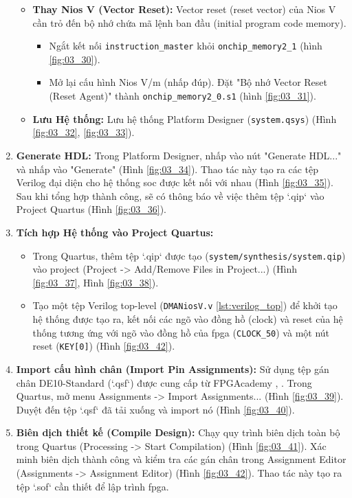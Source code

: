 \begin{enumerate}
\begin{itemize}
        \item \textbf{Thay Nios V (Vector Reset):} Vector reset (reset vector) của Nios V cần trỏ đến bộ nhớ chứa mã lệnh ban đầu (initial program code memory). 
        \begin{itemize}
            \item Ngắt kết nối \texttt{instruction\_master} khỏi \texttt{onchip\_memory2\_1} (hình \ref{fig:03_30}). 
            \item Mở lại cấu hình Nios V/m (nhấp đúp). Đặt "Bộ nhớ Vector Reset (Reset Agent)" thành \texttt{onchip\_memory2\_0.s1} (hình \ref{fig:03_31}).
        \end{itemize}
        \item \textbf{Lưu Hệ thống:} Lưu hệ thống Platform Designer (\texttt{system.qsys}) (Hình \ref{fig:03_32}, \ref{fig:03_33}).
    \end{itemize}
    \item \textbf{Generate HDL:} Trong Platform Designer, nhấp vào nút "Generate HDL..." và nhấp vào "Generate" (Hình \ref{fig:03_34}). Thao tác này tạo ra các tệp Verilog đại diện cho hệ thống \acrshort{soc} được kết nối với nhau (Hình \ref{fig:03_35}). Sau khi tổng hợp thành công, sẽ có thông báo về việc thêm tệp `.qip` vào Project Quartus (Hình \ref{fig:03_36}).
    \item \textbf{Tích hợp Hệ thống vào Project Quartus:}
    \begin{itemize}
        \item Trong Quartus, thêm tệp `.qip` được tạo (\texttt{system/synthesis/system.qip}) vào project (Project -> Add/Remove Files in Project...) (Hình \ref{fig:03_37}, Hình \ref{fig:03_38}).
        \item Tạo một tệp Verilog top-level (\texttt{DMANiosV.v} \ref{lst:verilog_top}) để khởi tạo hệ thống được tạo ra, kết nối các ngõ vào đồng hồ (clock) và reset của hệ thống tương ứng với ngõ vào đồng hồ của \acrshort{fpga} (\texttt{CLOCK\_50}) và một nút reset (\texttt{KEY[0]}) (Hình \ref{fig:03_42}). 
    \end{itemize}
    \item \textbf{Import cấu hình chân (Import Pin Assignments):} Sử dụng tệp gán chân DE10-Standard (`.qsf`) được cung cấp từ FPGAcademy \cite{fpgacademy-qsf}, \cite{fpgacademy-boards}. Trong Quartus, mở menu Assignments -> Import Assignments... (Hình \ref{fig:03_39}). Duyệt đến tệp `.qsf` đã tải xuống và import nó (Hình \ref{fig:03_40}).
    \item \textbf{Biên dịch thiết kế (Compile Design):} Chạy quy trình biên dịch toàn bộ trong Quartus (Processing -> Start Compilation) (Hình \ref{fig:03_41}). Xác minh biên dịch thành công và kiểm tra các gán chân trong Assignment Editor (Assignments -> Assignment Editor) (Hình \ref{fig:03_42}). Thao tác này tạo ra tệp `.sof` cần thiết để lập trình \acrshort{fpga}.
\end{enumerate}

